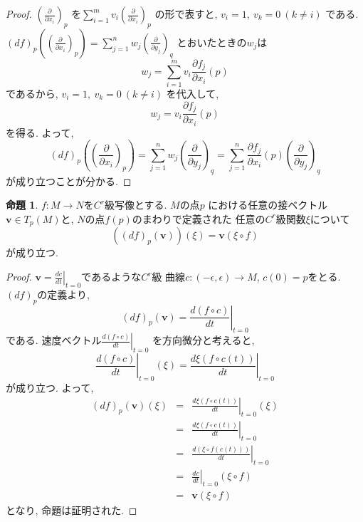 \documentclass[a4j,12pt]{jarticle}
\theoremstyle{definition}
\newtheorem{proposition}[theorem]{命題}
\begin{document}
\begin{proof}
    $\left(\frac{\partial}{\partial x_i}\right)_p$
    を$\sum_{i=1}^{m}v_i\left(\frac
    {\partial}{\partial x_i}\right)_p$
    の形で表すと, $v_i=1,\ v_k=0\ (k\neq i)$
    である. 
    $(df)_p\left( \left(
        \frac{\partial}{\partial x_i}
    \right)_p\right)=
    \sum_{j=1}^{n}w_j\left(
        \frac{\partial}{\partial y_j}
    \right)_q$
    とおいたときの$w_j$は
    $$w_j=\sum_{i=1}^{m}v_i \frac{\partial f_j}
    {\partial x_i}(p)$$
    であるから, $v_i=1,\ v_k=0\ (k\neq i)$
    を代入して, 
    $$w_j=v_i \frac{\partial f_j}
    {\partial x_i}(p)$$
    を得る. よって, 
    $$(df)_p\left( \left(
        \frac{\partial}{\partial x_i}
    \right)_p\right)=
    \sum_{j=1}^{n}w_j\left(
        \frac{\partial}{\partial y_j}
    \right)_q=
    \sum_{j=1}^{n}\frac{\partial f_j}
    {\partial x_i}(p)\left(
        \frac{\partial}{\partial y_j}
    \right)_q$$
    が成り立つことが分かる. 
\end{proof}
\begin{proposition}
    $f:M\to N$を$C^r$級写像とする. $M$の点$p$
    における任意の接ベクトル$\boldsymbol{v}
    \in T_p(M)$と, $N$の点$f(p)$のまわりで定義された
    任意の$C^r$級関数$\xi$について
    $$((df)_p(\boldsymbol{v}))(\xi)=
    \boldsymbol{v}(\xi \circ f)$$
    が成り立つ. 
\end{proposition}
\begin{proof}
    $\boldsymbol{v}=\left .\frac{dc}{dt}
    \right|_{t=0}$であるような$C^r$級
    曲線$c:(-\epsilon, \epsilon)\to M$, 
    $c(0)=p$をとる. $(df)_p$の定義より, 
    $$(df)_p(\boldsymbol{v})=
    \left .\frac{d(f\circ c)}{dt}\right|_{t=0}$$
    である. 
    速度ベクトル$\left .\frac{d(f\circ c)}{dt}\right|_{t=0}$
    を方向微分と考えると, 
    $$\left .\frac{d(f\circ c)}{dt}\right|_{t=0}
    (\xi)=
    \left .\frac{d\xi(f\circ c(t))}
    {dt}\right|_{t=0}$$
    が成り立つ. よって, 
    \begin{eqnarray*}
        (df)_p(\boldsymbol{v})(\xi)&=&
        \left .\frac{d\xi(f\circ c(t))}
        {dt}\right|_{t=0}(\xi)\\
        &=&\left .\frac{d\xi(f\circ c(t))}
        {dt}\right|_{t=0}\\
        &=&\left .\frac{d(\xi\circ f(c(t)))}
        {dt}\right|_{t=0}\\
        &=&
        \left .\frac{dc}{dt}\right|_{t=0}(\xi 
        \circ f)\\
        &=&\boldsymbol{v}(\xi\circ f)
    \end{eqnarray*}
    となり, 命題は証明された. 
\end{proof}
\end{document}
